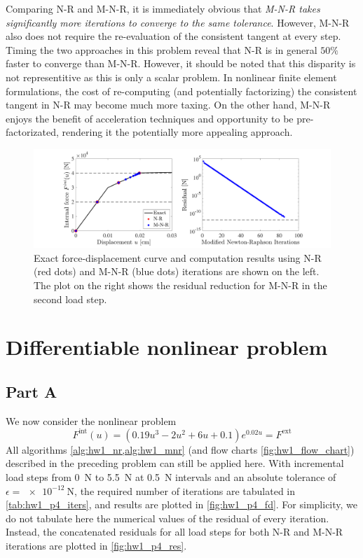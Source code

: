 Comparing N-R and M-N-R, it is immediately obvious that \emph{M-N-R takes significantly more iterations to converge to the same tolerance}.
However, M-N-R also does not require the re-evaluation of the consistent tangent at every step. 
Timing the two approaches in this problem reveal that N-R is in general $50\%$ faster to converge than M-N-R.
However, it should be noted that this disparity is not representitive as this is only a scalar problem.
In nonlinear finite element formulations, the cost of re-computing (and potentially factorizing) the consistent tangent in N-R may become much more taxing. On the other hand, M-N-R enjoys the benefit of acceleration techniques and opportunity to be pre-factorizated, rendering it the potentially more appealing approach. 
\begin{figure}[!ht]
    \centering
    \includegraphics[width=\linewidth]{homework/hw1/hw1_p3.pdf}
    \caption{Exact force-displacement curve and computation results using N-R (red dots) and M-N-R (blue dots) iterations are shown on the left. 
    The plot on the right shows the residual reduction for M-N-R in the second load step. }
    \label{fig:hw1_p3_fd}
\end{figure}

\section{Differentiable nonlinear problem}
\subsection*{Part A}
We now consider the nonlinear problem 
\begin{equation}\label{eqn:hw1_p4_nlp}
    F^{\textrm{int}}(u) = (0.19u^3 - 2u^2 + 6u + 0.1)e^{0.02u} = F^{\textrm{ext}}
\end{equation}
All algorithms \cref{alg:hw1_nr,alg:hw1_mnr} (and flow charts \cref{fig:hw1_flow_chart}) described in the preceding problem can still be applied here. 
With incremental load steps from \qty{0}{\newton} to \qty{5.5}{\newton} at \qty{0.5}{\newton} intervals and an absolute tolerance of $\epsilon = \qty{e-12}{\newton}$, the required number of iterations are tabulated in \cref{tab:hw1_p4_iters}, and results are plotted in \cref{fig:hw1_p4_fd}.
For simplicity, we do not tabulate here the numerical values of the residual of every iteration. 
Instead, the concatenated residuals for all load steps for both N-R and M-N-R iterations are plotted in \cref{fig:hw1_p4_res}.

